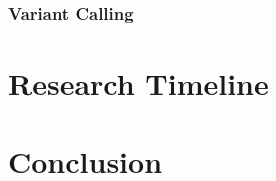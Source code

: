 \documentclass[twocolumn,10pt]{article}
\begin{document}
\subsubsection{Variant Calling}






\section{Research Timeline}


\section{Conclusion}

\begin{small}

\end{small}
\end{document}
